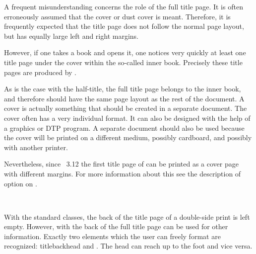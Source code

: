 \begin{Explain}
  A frequent misunderstanding concerns the role of the full title page.  It is
  often erroneously assumed that the cover or dust cover is
  meant.  Therefore, it is frequently expected that the title page does not
  follow the normal page layout, but has equally large left and right margins.

  However, if one takes a book and opens it, one notices very quickly at least
  one title page under the cover within the so-called inner book.  Precisely
  these title pages are produced by .

  As is the case with the half-title, the full title page belongs to the inner
  book, and therefore should have the same page layout as the rest of the
  document.  A cover is actually something that should be created in a
  separate document. The cover often has a very individual format. It can also
  be designed with the help of a graphics or DTP program. A separate document
  should also be used because the cover will be printed on a different medium,
  possibly cardboard, and possibly with another printer.

  Nevertheless, since \KOMAScript~3.12 the first title page of
   can be printed as a cover page with different margins. For
  more information about this see the description of option
   on .
\end{Explain}
%
%
%
%
%
%
%
%
%
%


\begin{Declaration}
  \\
\end{Declaration}%
%
%
%
With the standard classes, the back of the title page of a double-side print
is left empty.  However, with {\KOMAScript} the back of the full title page
can be used for other information. Exactly two elements which the user can
freely format are recognized: \PName
{titlebackhead}
and . The head can reach up to the foot and vice
versa. %
%
%
%



